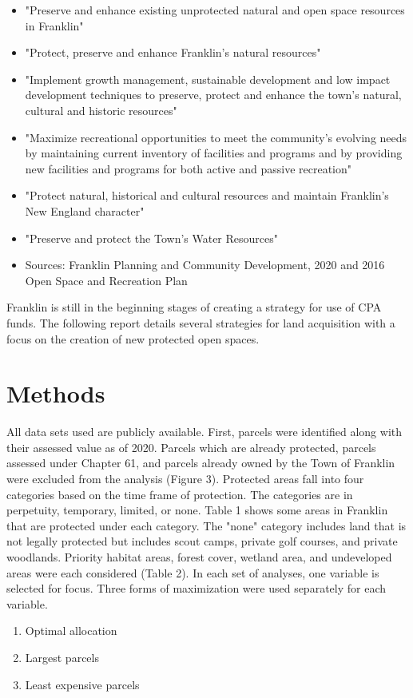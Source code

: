 \documentclass[12pt, stu, floatsintext,table]{apa7}
\begin{document}
\begin{itemize}
\setlength\itemsep{0.0em}
    \item "Preserve and enhance existing unprotected natural and open space resources in Franklin"
    \item "Protect, preserve and enhance Franklin’s natural resources"
    \item "Implement growth management, sustainable development and low impact development techniques to preserve, protect and enhance the town's natural, cultural and historic resources"
     \item "Maximize recreational opportunities to meet the community’s evolving needs by maintaining current inventory of facilities and programs and by providing new facilities and programs for both active and passive recreation"
    \item  "Protect natural, historical and cultural resources and maintain Franklin's New England character"
    \item "Preserve and protect the Town’s Water Resources"
    \item Sources: Franklin Planning and Community Development, 2020 and 2016 Open Space and Recreation Plan
\end{itemize}  
Franklin is still in the beginning stages of creating a strategy for use of CPA funds. The following report details several strategies for land acquisition with a focus on the creation of new protected open spaces. 


\section{Methods}  
All data sets used are publicly available. First, parcels were identified along with their assessed value as of 2020. Parcels which are already protected, parcels assessed under Chapter 61, and parcels already owned by the Town of Franklin were excluded from the analysis (Figure 3). Protected areas fall into four categories based on the time frame of protection. The categories are in perpetuity, temporary, limited, or none. Table 1 shows some areas in Franklin that are protected under each category. The "none" category includes land that is not legally protected but includes scout camps, private golf courses, and private woodlands. Priority habitat areas, forest cover, wetland area, and undeveloped areas were each considered (Table 2). In each set of analyses, one variable is selected for focus. Three forms of maximization were used separately for each variable. 
\begin{enumerate}
\setlength\itemsep{0.0em}
    \item Optimal allocation
    \item Largest parcels
    \item Least expensive parcels
\end{enumerate}  
\end{document}

